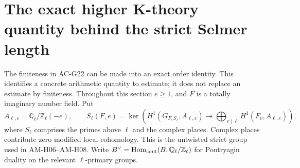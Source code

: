 \section{The exact higher K-theory quantity behind the strict Selmer length}
\label{sec:selmer-k-theory}

The finiteness in AC-G22 can be made into an exact order identity.
This identifies a concrete arithmetic quantity to estimate; it does
not replace an estimate by finiteness.  Throughout this section
$e\geq1$, and $F$ is a totally imaginary number field.  Put
\[
 A_{\ell,e}=\mathbb Q_\ell/\mathbb Z_\ell(-e),\qquad
 S_\ell(F,e)=\ker\left(H^1(G_{F,S_\ell},A_{\ell,e})
       \longrightarrow\bigoplus_{v\mid\ell}
                         H^1(F_v,A_{\ell,e})\right),
\]
where $S_\ell$ comprises the primes above $\ell$ and the complex
places.  Complex places contribute zero modified local cohomology.
This is the untwisted strict group used in AM-H06--AM-H08.
Write $B^\vee=\operatorname{Hom}_{\rm cont}(B,\mathbb Q_\ell/\mathbb Z_\ell)$
for Pontryagin duality on the relevant $\ell$-primary groups.

